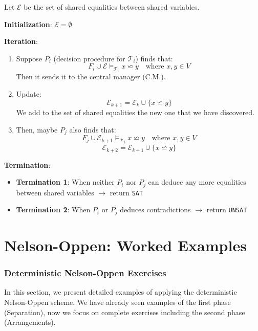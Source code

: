 \documentclass[11pt,a4paper]{article}
\theoremstyle{definition}
\theoremstyle{plain}
\theoremstyle{remark}
\begin{document}
\begin{tcolorbox}[colback=green!5!white,colframe=green!75!black,title=\textbf{Deterministic Nelson-Oppen Algorithm}]
Let $\mathcal{E}$ be the set of shared equalities between shared variables.

\textbf{Initialization}: $\mathcal{E} = \emptyset$

\textbf{Iteration}:
\begin{enumerate}
    \item Suppose $P_i$ (decision procedure for $\mathcal{T}_i$) finds that:
    \[
    F_i \cup \mathcal{E} \models_{\mathcal{T}_i} x \backsimeq y \quad \text{where } x, y \in V
    \]
    Then it sends it to the central manager (C.M.).

    \item Update:
    \[
    \mathcal{E}_{k+1} = \mathcal{E}_k \cup \{x \backsimeq y\}
    \]
    We add to the set of shared equalities the new one that we have discovered.

    \item Then, maybe $P_j$ also finds that:
    \[
    F_j \cup \mathcal{E}_{k+1} \models_{\mathcal{T}_j} x \backsimeq y \quad \text{where } x, y \in V
    \]
    \[
    \mathcal{E}_{k+2} = \mathcal{E}_{k+1} \cup \{x \backsimeq y\}
    \]
\end{enumerate}

\textbf{Termination}:
\begin{itemize}
    \item \textbf{Termination 1}: When neither $P_i$ nor $P_j$ can deduce any more equalities between shared variables $\longrightarrow$ return \texttt{SAT}
    \item \textbf{Termination 2}: When $P_i$ or $P_j$ deduces contradictions $\longrightarrow$ return \texttt{UNSAT}
\end{itemize}
\end{tcolorbox}


\newpage

\part{Nelson-Oppen: Worked Examples}

\section{Deterministic Nelson-Oppen Exercises}

In this section, we present detailed examples of applying the deterministic Nelson-Oppen scheme. We have already seen examples of the first phase (Separation), now we focus on complete exercises including the second phase (Arrangements).
\end{document}
